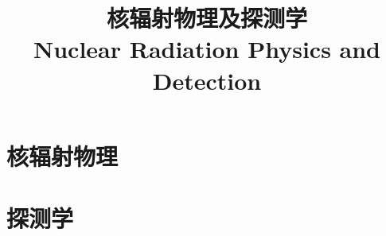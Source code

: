 \documentclass{../thunote}
\title{核辐射物理及探测学\\Nuclear Radiation Physics and Detection}
\begin{document}
\maketitle

\frontmatter
\tableofcontents
\listoffigures
\listoftables



\mainmatter
\part{核辐射物理}







\part{探测学}








\appendix

\end{document}
